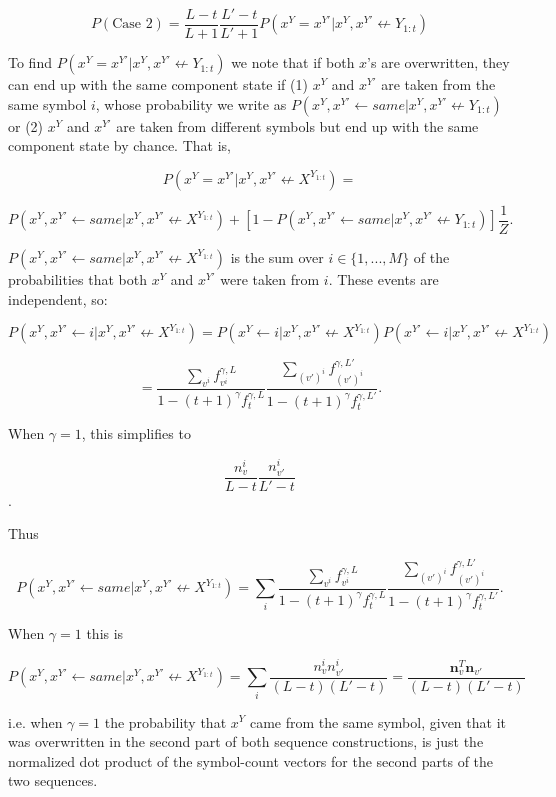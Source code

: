 \documentclass{article}
\begin{document}
\begin{appendices}
$$P(\textrm{Case 2}) = \frac{L-t}{L+1}\frac{L'-t}{L'+1}P(x^Y = x^{Y'}|x^Y, x^{Y'} \not\leftarrow Y_{1:t})$$

To find $P(x^Y = x^{Y'}|x^Y, x^{Y'} \not\leftarrow Y_{1:t})$ we note that if both $x$'s are overwritten, they can end up with the same component state if (1) $x^Y$ and $x^{Y'}$ are taken from the same symbol $i$, whose probability we write as $P(x^Y, x^{Y'} \leftarrow same|x^Y, x^{Y'} \not\leftarrow Y_{1:t})$ or (2) $x^Y$ and $x^{Y'}$ are taken from different symbols but end up with the same component state by chance. That is,

$$P(x^Y = x^{Y'}|x^Y, x^{Y'} \not\leftarrow X^{Y_{1:t}}) =$$

$$P(x^Y, x^{Y'} \leftarrow same|x^Y, x^{Y'} \not\leftarrow X^{Y_{1:t}}) + [1 - P(x^Y, x^{Y'} \leftarrow same|x^Y, x^{Y'} \not\leftarrow Y_{1:t})]\frac{1}{Z}.$$

$P(x^Y, x^{Y'} \leftarrow same|x^Y, x^{Y'} \not\leftarrow X^{Y_{1:t}})$ is the sum over $i \in \{1, ..., M\}$ of the probabilities that both $x^Y$ and $x^{Y'}$ were taken from $i$. These events are independent, so:

$$P(x^Y, x^{Y'} \leftarrow i|x^Y, x^{Y'} \not\leftarrow X^{Y_{1:t}}) = P(x^Y \leftarrow i|x^Y, x^{Y'} \not\leftarrow X^{Y_{1:t}})P(x^{Y'} \leftarrow i|x^Y, x^{Y'} \not\leftarrow X^{Y_{1:t}})$$

$$ = \frac{\sum\limits_{v^i} f_{v^i}^{\gamma,L}}{1 - (t+1)^\gamma f^{\gamma,L}_t} \frac{\sum\limits_{(v')^i} f^{\gamma,L'}_{(v')^i}}{1 - (t+1)^\gamma f^{\gamma,L'}_t}.$$

When $\gamma = 1$, this simplifies to

$$\frac{n^i_v}{L-t}\frac{n^i_{v'}}{L'-t}$$.

Thus

$$P(x^Y, x^{Y'} \leftarrow same|x^Y, x^{Y'} \not\leftarrow X^{Y_{1:t}}) = \sum_i \frac{\sum\limits_{v^i} f^{\gamma,L}_{v^i}}{1 - (t+1)^\gamma f^{\gamma,L}_t} \frac{\sum\limits_{(v')^i} f^{\gamma,L'}_{(v')^i}}{1 - (t+1)^\gamma f^{\gamma,L'}_t}.$$

When $\gamma = 1$ this is

$$P(x^Y, x^{Y'} \leftarrow same|x^Y, x^{Y'} \not\leftarrow X^{Y_{1:t}}) = \sum_i \frac{n^i_vn^i_{v'}}{(L-t)(L'-t)} = \frac{\mathbf{n}^T_v\mathbf{n}_{v'}}{(L-t)(L'-t)}$$

i.e. when $\gamma = 1$ the probability that $x^Y$ came from the same symbol, given that it was overwritten in the second part of both sequence constructions, is just the normalized dot product of the symbol-count vectors for the second parts of the two sequences.


\end{appendices}
\end{document}
